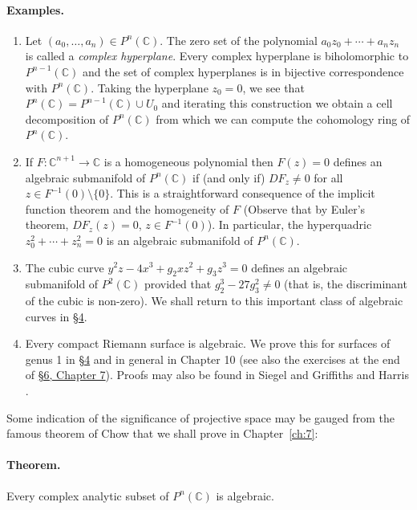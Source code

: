 \paragraph*{Examples.}
\begin{enumerate}
\item Let $(a_0,\ldots,a_n)\in P^n(\mathbb C)$. The zero set of the polynomial $a_0z_0+\cdots+a_nz_n$ is called a \emph{complex hyperplane}. Every complex hyperplane is biholomorphic to $P^{n-1}(\mathbb C)$ and the set of complex hyperplanes is in bijective correspondence with $P^n(\mathbb C)$. Taking the hyperplane $z_0=0$, we see that $P^n(\mathbb C)=P^{n-1}(\mathbb C)\cup U_0$ and iterating this construction we obtain a cell decomposition of $P^n(\mathbb C)$ from which we can compute the cohomology ring of $P^n(\mathbb C)$.
\item If $F:\mathbb C^{n+1}\longrightarrow\mathbb C$ is a homogeneous polynomial then $F(z)=0$ defines an algebraic submanifold of $P^n(\mathbb C)$ if (and only if) $DF_z\neq0$ for all $z\in F^{-1}(0)\setminus\{0\}$. This is a straightforward consequence of the implicit function theorem and the homogeneity of $F$ (Observe that by Euler's theorem, $DF_z(z)=0$, $z\in F^{-1}(0)$). In particular, the hyperquadric $z_0^2+\cdots+z_n^2=0$ is an algebraic submanifold of $P^n(\mathbb C)$.
\item The cubic curve $y^2z-4x^3+g_2xz^2+g_3z^3=0$ defines an algebraic submanifold of $P^2(\mathbb C)$ provided that $g_2^3-27g_3^2\neq0$ (that is, the discriminant of the cubic is non-zero). We shall return to this important class of algebraic curves in \hyperref[sec:4:4]{\S4}.
\item Every compact Riemann surface is algebraic. We prove this for surfaces of genus 1 in \hyperref[sec:4:4]{\S4} and in general in Chapter 10 (see also the exercises at the end of \hyperref[sec:7:6]{\S6, Chapter 7}). Proofs may also be found in Siegel \cite[Chapter 2]{bib:I:siegel-c-l:1} and Griffiths and Harris \cite[page 213]{bib:I:griffiths-p-and-harris-j:1}.
\end{enumerate}
Some indication of the significance of projective space may be gauged from the famous theorem of Chow that we shall prove in Chapter~\ref{ch:7}:
\paragraph*{Theorem.} Every complex analytic subset of $P^n(\mathbb C)$ is algebraic.

